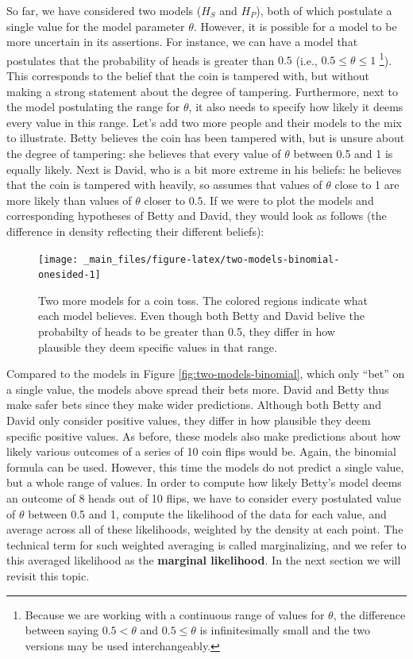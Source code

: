 \documentclass[
]{book}
\begin{document}
So far, we have considered two models (\(H_S\) and \(H_P\)), both of which postulate a single value for the model parameter \(\theta\). However, it is possible for a model to be more uncertain in its assertions. For instance, we can have a model that postulates that the probability of heads is greater than \(0.5\) (i.e., \(0.5 \leq \theta \leq 1\) \footnote{Because we are working with a continuous range of values for \(\theta\), the difference between saying \(0.5 < \theta\) and \(0.5 \leq \theta\) is infinitesimally small and the two versions may be used interchangeably.}). This corresponds to the belief that the coin is tampered with, but without making a strong statement about the degree of tampering. Furthermore, next to the model postulating the range for \(\theta\), it also needs to specify how likely it deems every value in this range. Let's add two more people and their models to the mix to illustrate. Betty believes the coin has been tampered with, but is unsure about the degree of tampering: she believes that every value of \(\theta\) between 0.5 and 1 is equally likely. Next is David, who is a bit more extreme in his beliefs: he believes that the coin is tampered with heavily, so assumes that values of \(\theta\) close to 1 are more likely than values of \(\theta\) closer to \(0.5\).
If we were to plot the models and corresponding hypotheses of Betty and David, they would look as follows (the difference in density reflecting their different beliefs):

\begin{figure}

{\centering \texttt{[image: \_main\_files/figure-latex/two-models-binomial-onesided-1]} 

}

\caption{Two more models for a coin toss. The colored regions indicate what each model believes. Even though both Betty and David belive the probabilty of heads to be greater than 0.5, they differ in how plausible they deem specific values in that range.}\label{fig:two-models-binomial-onesided}
\end{figure}

Compared to the models in Figure \ref{fig:two-models-binomial}, which only ``bet'' on a single value, the models above spread their bets more. David and Betty thus make safer bets since they make wider predictions.
Although both Betty and David only consider positive values, they differ in how plausible they deem specific positive values. As before, these models also make predictions about how likely various outcomes of a series of 10 coin flips would be. Again, the binomial formula can be used. However, this time the models do not predict a single value, but a whole range of values. In order to compute how likely Betty's model deems an outcome of 8 heads out of 10 flips, we have to consider every postulated value of \(\theta\) between 0.5 and 1, compute the likelihood of the data for each value, and average across all of these likelihoods, weighted by the density at each point. The technical term for such weighted averaging is called marginalizing, and we refer to this averaged likelihood as the \textbf{marginal likelihood}. In the next section we will revisit this topic.
\end{document}
